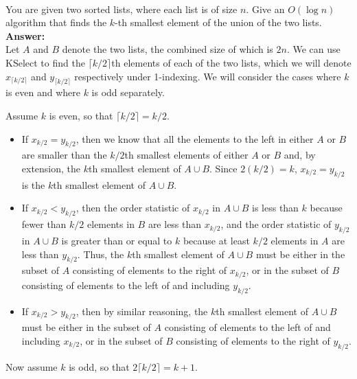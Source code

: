 \documentclass[a4paper,11pt]{article}
\begin{document}
\bigskip
{}\\
You are given two sorted lists, where each list is of size $n$.
Give an $O(\log n  )$ algorithm that finds the $k$-th smallest element of the union of the two lists. \\
{\bf Answer:}\\
Let $A$ and $B$ denote the two lists, the combined size of which is $2n$. We can use KSelect to find the $\lceil k/2 \rceil$th elements of each of the two lists, which we will denote $x_{\lceil k/2 \rceil}$ and $y_{\lceil k/2 \rceil}$ respectively under 1-indexing. We will consider the cases where $k$ is even and where $k$ is odd separately. \par
Assume $k$ is even, so that $\lceil k/2 \rceil = k/2$.
\begin{itemize}
    \item
        If $x_{k/2} = y_{k/2}$, then we know that all the elements to the left in either $A$ or $B$ are smaller than the $k/2$th smallest elements of either $A$ or $B$ and, by extension, the $k$th smallest element of $A \cup B$. Since $2(k/2) = k$, $x_{k/2} = y_{k/2}$ is the $k$th smallest element of $A \cup B$.
    \item
        If $x_{k/2} < y_{k/2}$, then the order statistic of $x_{k/2}$ in $A \cup B$ is less than $k$ because fewer than $k/2$ elements in $B$ are less than $x_{k/2}$, and the order statistic of $y_{k/2}$ in $A \cup B$ is greater than or equal to $k$ because at least $k/2$ elements in $A$ are less than $y_{k/2}$. Thus, the $k$th smallest element of $A \cup B$ must be either in the subset of $A$ consisting of elements to the right of $x_{k/2}$, or in the subset of $B$ consisting of elements to the left of and including $y_{k/2}$.
    \item
        If $x_{k/2} > y_{k/2}$, then by similar reasoning, the $k$th smallest element of $A \cup B$ must be either in the subset of $A$ consisting of elements to the left of and including $x_{k/2}$, or in the subset of $B$ consisting of elements to the right of $y_{k/2}$.
\end{itemize}
Now assume $k$ is odd, so that $2\lceil k/2 \rceil = k + 1$. \par
\end{document}
